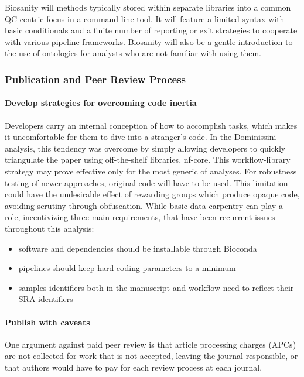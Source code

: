 \documentclass{drexelthesis}
\begin{document}
Biosanity will methods typically stored within separate libraries into a common QC-centric focus in a command-line tool. It will feature a limited syntax with basic conditionals and a finite number of reporting or exit strategies to cooperate with various pipeline frameworks. Biosanity will also be a gentle introduction to the use of ontologies for analysts who are not familiar with using them.

\subsubsection{Publication and Peer Review Process}

\paragraph{Develop strategies for overcoming code inertia}

Developers carry an internal conception of how to accomplish tasks, which makes it uncomfortable for them to dive into a stranger's code. In the Dominissini analysis, this tendency was overcome by simply allowing developers to quickly triangulate the paper using off-the-shelf libraries, nf-core. This workflow-library strategy may prove effective only for the most generic of analyses. For robustness testing of newer approaches, original code will have to be used. This limitation could have the undesirable effect of rewarding groups which produce opaque code, avoiding scrutiny through obfuscation. While basic data carpentry can play a role, incentivizing three main requirements, that have been recurrent issues throughout this analysis:

\begin{itemize}
	\item software and dependencies should be installable through Bioconda
    \item pipelines should keep hard-coding parameters to a minimum
    \item samples identifiers both in the manuscript and workflow need to reflect their SRA identifiers
\end{itemize}

\paragraph{Publish with caveats}

One argument against paid peer review is that article processing charges (APCs) are not collected for work that is not accepted, leaving the journal responsible, or that authors would have to pay for each review process at each journal.
\end{document}
